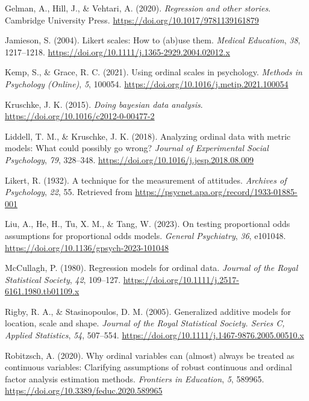 \documentclass[
  man,floatsintext]{apa6}
\newlength{\cslhangindent}
\newenvironment{CSLReferences}[2] %
 {\begin{list}{}{%
  \setlength{\itemindent}{0pt}
  \setlength{\leftmargin}{0pt}
  \setlength{\parsep}{0pt}
  \ifodd #1
   \setlength{\leftmargin}{\cslhangindent}
   \setlength{\itemindent}{-1\cslhangindent}
  \fi
  \setlength{\itemsep}{#2\baselineskip}}}
 {\end{list}}
\begin{document}
\begin{CSLReferences}{1}{0}
Gelman, A., Hill, J., \& Vehtari, A. (2020). \emph{Regression and other stories}. Cambridge University Press. \url{https://doi.org/10.1017/9781139161879}

Jamieson, S. (2004). Likert scales: How to (ab)use them. \emph{Medical Education}, \emph{38}, 1217--1218. \url{https://doi.org/10.1111/j.1365-2929.2004.02012.x}

Kemp, S., \& Grace, R. C. (2021). Using ordinal scales in psychology. \emph{Methods in Psychology (Online)}, \emph{5}, 100054. \url{https://doi.org/10.1016/j.metip.2021.100054}

Kruschke, J. K. (2015). \emph{Doing bayesian data analysis}. \url{https://doi.org/10.1016/c2012-0-00477-2}

Liddell, T. M., \& Kruschke, J. K. (2018). Analyzing ordinal data with metric models: What could possibly go wrong? \emph{Journal of Experimental Social Psychology}, \emph{79}, 328--348. \url{https://doi.org/10.1016/j.jesp.2018.08.009}

Likert, R. (1932). A technique for the measurement of attitudes. \emph{Archives of Psychology}, \emph{22}, 55. Retrieved from \url{https://psycnet.apa.org/record/1933-01885-001}

Liu, A., He, H., Tu, X. M., \& Tang, W. (2023). On testing proportional odds assumptions for proportional odds models. \emph{General Psychiatry}, \emph{36}, e101048. \url{https://doi.org/10.1136/gpsych-2023-101048}

McCullagh, P. (1980). Regression models for ordinal data. \emph{Journal of the Royal Statistical Society}, \emph{42}, 109--127. \url{https://doi.org/10.1111/j.2517-6161.1980.tb01109.x}

Rigby, R. A., \& Stasinopoulos, D. M. (2005). Generalized additive models for location, scale and shape. \emph{Journal of the Royal Statistical Society. Series C, Applied Statistics}, \emph{54}, 507--554. \url{https://doi.org/10.1111/j.1467-9876.2005.00510.x}

Robitzsch, A. (2020). Why ordinal variables can (almost) always be treated as continuous variables: Clarifying assumptions of robust continuous and ordinal factor analysis estimation methods. \emph{Frontiers in Education}, \emph{5}, 589965. \url{https://doi.org/10.3389/feduc.2020.589965}


\end{CSLReferences}
\end{document}
